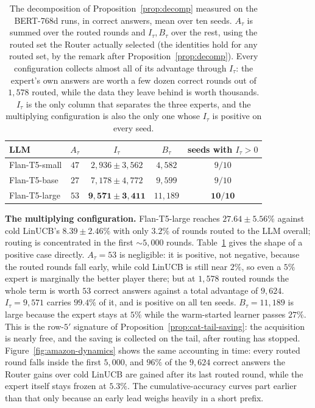 \documentclass[anon]{alt2027} %
\begin{document}
\begin{table}[h]
\centering
\caption{The decomposition of Proposition~\ref{prop:decomp} measured on the
BERT-768d runs, in correct answers, mean over ten seeds. $A_\tau$ is summed
over the routed rounds and $I_\tau,B_\tau$ over the rest, using the routed set
the Router actually selected (the identities hold for any routed set, by the
remark after Proposition~\ref{prop:decomp}). Every configuration collects
almost all of its advantage through $I_\tau$: the expert's own answers are
worth a few dozen correct rounds out of $1{,}578$ routed, while the data they
leave behind is worth thousands. $I_\tau$ is the only column that separates
the three experts, and the multiplying configuration is also the only one whose
$I_\tau$ is positive on every seed.}
\label{tab:amazon-decomp}
\small
\begin{tabular}{@{}lcccc@{}}
\toprule
LLM & $A_\tau$ & $I_\tau$ & $B_\tau$ & seeds with $I_\tau>0$ \\
\midrule
Flan-T5-small  & $47$ & $2{,}936\pm3{,}562$ & $4{,}582$ & $9/10$ \\
Flan-T5-base   & $27$ & $7{,}178\pm4{,}772$ & $9{,}599$ & $9/10$ \\
Flan-T5-large  & $53$ & $\mathbf{9{,}571\pm3{,}411}$ & $11{,}189$ & $\mathbf{10/10}$ \\
\bottomrule
\end{tabular}
\end{table}

\textbf{The multiplying configuration.} Flan-T5-large reaches
$27.64\pm5.56\%$ against cold LinUCB's $8.39\pm2.46\%$ with only $3.2\%$ of
rounds routed to the LLM overall; routing is concentrated in the first
$\sim5{,}000$ rounds. Table~\ref{tab:amazon-decomp} gives the shape of a
positive case directly. $A_{\tau}=53$ is negligible: it is positive, not
negative, because the routed rounds fall early, while cold LinUCB is still
near $2\%$, so even a $5\%$ expert is marginally the better player there; but
at $1{,}578$ routed rounds the whole term is worth $53$ correct answers
against a total advantage of $9{,}624$. $I_{\tau}=9{,}571$ carries $99.4\%$ of
it, and is positive on all ten seeds. $B_{\tau}=11{,}189$ is large because the
expert stays at $5\%$ while the warm-started learner passes $27\%$. This is
the row-$5'$ signature of Proposition~\ref{prop:cat-tail-saving}: the
acquisition is nearly free, and the saving is collected on the tail, after
routing has stopped. Figure~\ref{fig:amazon-dynamics} shows the same
accounting in time: every routed round falls inside the first $5{,}000$, and
$96\%$ of the $9{,}624$ correct answers the Router gains over cold LinUCB are
gained after its last routed round, while the expert itself stays frozen at
$5.3\%$. The cumulative-accuracy curves part earlier than that only because an
early lead weighs heavily in a short prefix.
\end{document}
